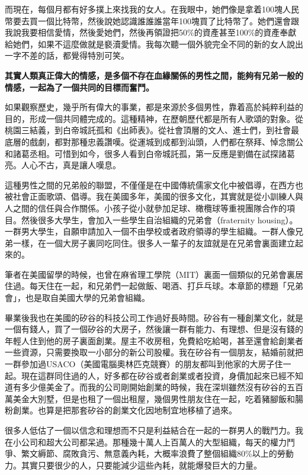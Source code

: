 而現在，每個月都有好多撲上來找我的女人。在我眼中，她們像是拿着100塊人民幣要去買一個比特幣，然後說她認識誰誰誰當年100塊買了比特幣了。她們還會跟我說我要相信愛情，然後愛她們，然後再領證把50\%的資產甚至100\%的資產奉獻給她們，如果不這麼做就是褻瀆愛情。我每次聽一個外貌完全不同的新的女人說出一字不差的話，都覺得特別可笑。

\textbf{其實人類真正偉大的情感，是多個不存在血緣關係的男性之間，能夠有兄弟一般的情感，一起為了一個共同的目標而奮鬥。}

如果觀察歷史，幾乎所有偉大的事業，都是來源於多個男性，靠着高於純粹利益的目的，形成一個共同體完成的。這種精神，在歷朝歷代都是所有人歌頌的對象。從桃園三結義，到白帝城託孤和《出師表》。從社會頂層的文人、進士們，到社會最底層的戲劇，都對那種忠義讚嘆。從運城到成都到汕頭，人們都在祭拜、悼念關公和諸葛丞相。可惜到如今，很多人看到白帝城託孤，第一反應是劉備在試探諸葛亮。人心不古，真是讓人嘆息。

這種男性之間的兄弟般的聯盟，不僅僅是在中國傳統儒家文化中被倡導，在西方也被社會正面歌頌、倡導。我在美國多年，美國的很多文化，其實就是從小訓練人與人之間的信任與合作關係。小孩子從小就參加足球、橄欖球等重視團隊合作的項目。然後很多大學生，會加入一些學生自治組織的兄弟會（fraternity housing）。一群男大學生，自願申請加入一個不由學校或者政府領導的學生組織。一群人像兄弟一樣，在一個大房子裏同吃同住。很多人一輩子的友誼就是在兄弟會裏面建立起來的。

筆者在美國留學的時候，也曾在麻省理工學院（MIT）裏面一個類似的兄弟會裏居住過。每天住在一起，和兄弟們一起做飯、喝酒、打乒乓球。本章節的標題「兄弟會」，也是取自美國大學的兄弟會組織。

畢業後我也在美國的矽谷的科技公司工作過好長時間。矽谷有一種創業文化，就是一個有錢人，買了一個矽谷的大房子，然後讓一群有能力、有理想、但是沒有錢的年輕人住到他的房子裏面創業。屋主不收房租，免費給吃給喝，甚至還會給創業者一些資源，只需要換取一小部分的新公司股權。我在矽谷有一個朋友，結婚前就把一群參加過USACO（美國電腦奧林匹克競賽）的朋友都叫到他家的大房子住一起。現在這群同住過的人，好多都在矽谷或者創業或者投資，身價加起來已經不知道有多少億美金了。而我的公司剛開始創業的時候，我在深圳雖然沒有矽谷的五百萬美金大別墅，但是也租了一個出租屋，幾個男性朋友住在一起，吃着豬腳飯和腸粉創業。也算是把那套矽谷的創業文化因地制宜地移植了過來。

很多人低估了一個以信念和理想而不只是利益結合在一起的一群男人的戰鬥力。我在小公司和超大公司都呆過。那種幾十萬人上百萬人的大型組織，每天的權力鬥爭、繁文縟節、腐敗貪污、無意義內耗，大概率浪費了整個組織80\%以上的勞動力。其實只要很少的人，只要能減少這些內耗，就能爆發巨大的力量。

